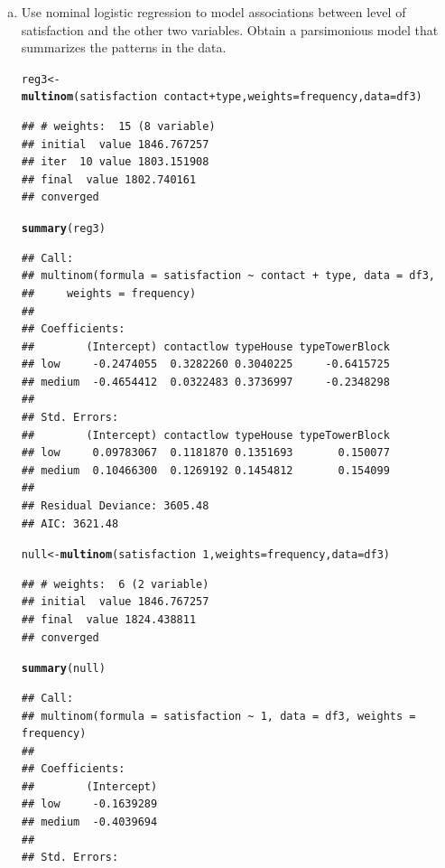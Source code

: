 \documentclass[12pt,fleqn]{article}\usepackage[]{graphicx}\usepackage[]{color}
\makeatletter
\newcommand{\hlnum}[1]{\textcolor[rgb]{0.686,0.059,0.569}{#1}}%
\newcommand{\hlopt}[1]{\textcolor[rgb]{0,0,0}{#1}}%
\newcommand{\hlstd}[1]{\textcolor[rgb]{0.345,0.345,0.345}{#1}}%
\newcommand{\hlkwb}[1]{\textcolor[rgb]{0.69,0.353,0.396}{#1}}%
\newcommand{\hlkwc}[1]{\textcolor[rgb]{0.333,0.667,0.333}{#1}}%
\newcommand{\hlkwd}[1]{\textcolor[rgb]{0.737,0.353,0.396}{\textbf{#1}}}%
\newenvironment{kframe}{%
 \def\at@end@of@kframe{}%
 \ifinner\ifhmode%
  \def\at@end@of@kframe{\end{minipage}}%
  \begin{minipage}{\columnwidth}%
 \fi\fi%
 \def\FrameCommand##1{\hskip\@totalleftmargin \hskip-\fboxsep
 \colorbox{shadecolor}{##1}\hskip-\fboxsep
     \hskip-\linewidth \hskip-\@totalleftmargin \hskip\columnwidth}%
 \MakeFramed {\advance\hsize-\width
   \@totalleftmargin\z@ \linewidth\hsize
   \@setminipage}}%
 {\par\unskip\endMakeFramed%
 \at@end@of@kframe}
\newenvironment{knitrout}{}{} %
\theoremstyle{definition}
\makeatother
\begin{document}
\begin{enumerate}[1.]
\begin{enumerate}[a.]
        \item Use nominal logistic regression to model associations between level of satisfaction and the other two variables. Obtain a parsimonious model that summarizes the patterns in the data.
\begin{knitrout}
\color{fgcolor}\begin{kframe}
\begin{alltt}
\hlstd{reg3} \hlkwb{<-} \hlkwd{multinom}\hlstd{(satisfaction} \hlopt{~} \hlstd{contact} \hlopt{+} \hlstd{type,} \hlkwc{weights} \hlstd{= frequency,} \hlkwc{data} \hlstd{= df3)}
\end{alltt}
\begin{verbatim}
## # weights:  15 (8 variable)
## initial  value 1846.767257 
## iter  10 value 1803.151908
## final  value 1802.740161 
## converged
\end{verbatim}
\begin{alltt}
\hlkwd{summary}\hlstd{(reg3)}
\end{alltt}
\begin{verbatim}
## Call:
## multinom(formula = satisfaction ~ contact + type, data = df3, 
##     weights = frequency)
## 
## Coefficients:
##        (Intercept) contactlow typeHouse typeTowerBlock
## low     -0.2474055  0.3282260 0.3040225     -0.6415725
## medium  -0.4654412  0.0322483 0.3736997     -0.2348298
## 
## Std. Errors:
##        (Intercept) contactlow typeHouse typeTowerBlock
## low     0.09783067  0.1181870 0.1351693       0.150077
## medium  0.10466300  0.1269192 0.1454812       0.154099
## 
## Residual Deviance: 3605.48 
## AIC: 3621.48
\end{verbatim}
\begin{alltt}
\hlstd{null} \hlkwb{<-} \hlkwd{multinom}\hlstd{(satisfaction} \hlopt{~} \hlnum{1}\hlstd{,} \hlkwc{weights} \hlstd{= frequency,} \hlkwc{data} \hlstd{= df3)}
\end{alltt}
\begin{verbatim}
## # weights:  6 (2 variable)
## initial  value 1846.767257 
## final  value 1824.438811 
## converged
\end{verbatim}
\begin{alltt}
\hlkwd{summary}\hlstd{(null)}
\end{alltt}
\begin{verbatim}
## Call:
## multinom(formula = satisfaction ~ 1, data = df3, weights = frequency)
## 
## Coefficients:
##        (Intercept)
## low     -0.1639289
## medium  -0.4039694
## 
## Std. Errors:

\end{verbatim}
\end{kframe}
\end{knitrout}
\end{enumerate}
\end{enumerate}
\end{document}
